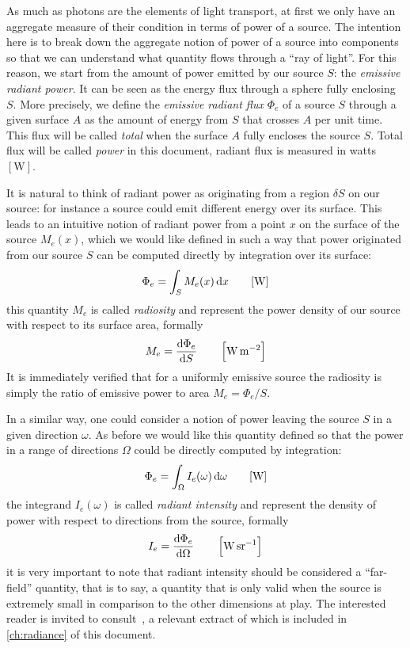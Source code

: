 As much as photons are the elements of light transport, at first we only have an
aggregate measure of their condition in terms of power of a source.
The intention here is to break down the aggregate notion of power of a source
into components so that we can understand what quantity flows through a ``ray of
light''.
For this reason, we start from the amount of power emitted by our source $S$:
the \textsl{emissive radiant power}.
It can be seen as the energy flux through a sphere fully enclosing $S$.
More precisely, we define the \textsl{emissive radiant flux} $\Phi_e$ of a
source $S$ through a given surface $A$ as the amount of energy from $S$ that
crosses $A$ per unit time. This flux will be called \textsl{total} when the surface
$A$ fully encloses the source $S$. Total flux will be called \textsl{power} in
this
document, radiant flux is measured in watts $[\si{\watt}]$.

It is natural to think of radiant power as originating from a region $\delta S$ on our source:
for instance a source could emit different energy over its surface. This leads to an
intuitive notion of radiant power from a point $x$ on the surface of the source
$M_e(x)$, which
we would like defined in such a way that power originated from our source $S$
can be computed
directly by integration over its surface:
\begin{displaymath}
\Phi_e = \int_{S} M_e(x) \mathop{}\!\mathrm{d} x \qquad [\si{\watt}]
\end{displaymath}
this quantity $M_e$ is called \textsl{radiosity} and represent the power density
of our
source with respect to its surface area, formally
\begin{displaymath}
M_e = \frac{\mathop{}\!\mathrm{d}\Phi_e}{\mathop{}\!\mathrm{d} S} \qquad \left[\si{\watt\per\square\meter}\right]
\end{displaymath}
It is immediately verified that for a uniformly emissive source the
radiosity is simply the ratio of emissive power to area
$M_e = \Phi_e / S$.

In a similar way, one could consider a notion of power leaving the source $S$ in
a given
direction $\omega$.
As before we would like this quantity defined so that the power in a range of
directions
$\Omega$ could be directly computed by integration:
\begin{displaymath}
\Phi_e = \int_\Omega I_e(\omega) \mathop{}\!\mathrm{d}\omega \qquad [\si{\watt}]
\end{displaymath}
the integrand $I_e(\omega)$ is called \textsl{radiant intensity} and represent
the density
of power with respect to directions from the source, formally
\begin{displaymath}
I_e = \frac{\d\Phi_e}{\d\Omega} \qquad \left[\si{\watt\per\steradian}\right]
\end{displaymath}
it is very important to note that radiant intensity should be considered a
``far-field'' quantity, that is to say, a quantity that is only valid when
the source is extremely small in comparison to the other dimensions at play.
The interested reader is invited to consult~\cite{nicodemus63}, a relevant
extract of which is included in \cref{ch:radiance} of this document.


